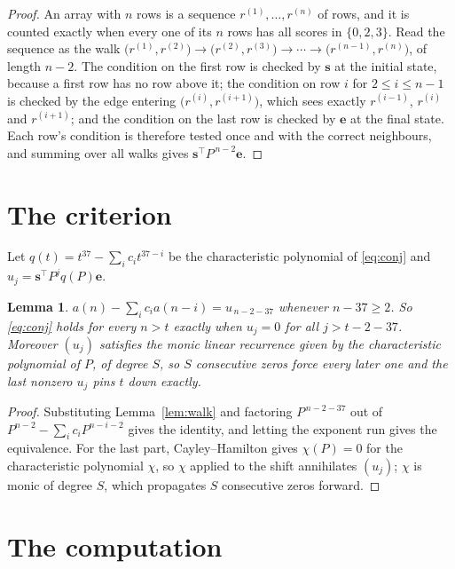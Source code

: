 \documentclass[11pt,a4paper]{article}
\theoremstyle{plain}
\newtheorem{lemma}[theorem]{Lemma}
\theoremstyle{definition}
\begin{document}
\begin{proof}
An array with $n$ rows is a sequence $r^{(1)},\dots,r^{(n)}$ of rows, and it is counted
exactly when every one of its $n$ rows has all scores in $\{0,2,3\}$. Read the sequence as the
walk $\bigl(r^{(1)},r^{(2)}\bigr)\to\bigl(r^{(2)},r^{(3)}\bigr)\to\cdots\to
\bigl(r^{(n-1)},r^{(n)}\bigr)$, of length $n-2$. The condition on the first row is
checked by $\mathbf{s}$ at the initial state, because a first row has no row above it; the
condition on row $i$ for $2\le i\le n-1$ is checked by the edge entering
$\bigl(r^{(i)},r^{(i+1)}\bigr)$, which sees exactly $r^{(i-1)}$, $r^{(i)}$ and
$r^{(i+1)}$; and the condition on the last row is checked by $\mathbf{e}$ at the final
state. Each row's condition is therefore tested once and with the correct neighbours, and
summing over all walks gives $\mathbf{s}^{\!\top}P^{\,n-2}\mathbf{e}$.
\end{proof}

\section{The criterion}

Let $q(t)=t^{37}-\sum_i c_i t^{37-i}$ be the characteristic polynomial of
\eqref{eq:conj} and $u_j=\mathbf{s}^{\!\top}P^{j}q(P)\mathbf{e}$.

\begin{lemma}\label{lem:crit}
$a(n)-\sum_i c_i a(n-i)=u_{\,n-2-37}$ whenever $n-37\ge2$. So \eqref{eq:conj}
holds for every $n>t$ exactly when $u_j=0$ for all $j>t-2-37$. Moreover $(u_j)$
satisfies the monic linear recurrence given by the characteristic polynomial of $P$, of
degree $S$, so $S$ consecutive zeros force every later one and the last nonzero $u_j$ pins
$t$ down exactly.
\end{lemma}

\begin{proof}
Substituting Lemma~\ref{lem:walk} and factoring $P^{\,n-2-37}$ out of
$P^{n-2}-\sum_i c_i P^{n-i-2}$ gives the identity, and letting the exponent run gives the
equivalence. For the last part, Cayley--Hamilton gives $\chi(P)=0$ for the characteristic
polynomial $\chi$, so $\chi$ applied to the shift annihilates $(u_j)$; $\chi$ is monic of
degree $S$, which propagates $S$ consecutive zeros forward.
\end{proof}

\section{The computation}
\end{document}
